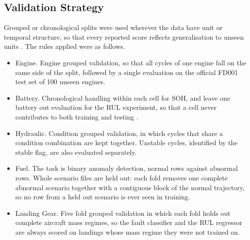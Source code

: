 \documentclass[conference]{IEEEtran}
\begin{document}
\subsection{Validation Strategy}
Grouped or chronological splits were used wherever the data have unit or temporal structure, so that every reported score reflects generalisation to unseen units \cite{b52, b53}. The rules applied were as follows.

\begin{itemize}
\item Engine. Engine grouped validation, so that all cycles of one engine fall on the same side of the split, followed by a single evaluation on the official FD001 test set of 100 unseen engines.
\item Battery. Chronological handling within each cell for SOH, and leave one battery out evaluation for the RUL experiment, so that a cell never contributes to both training and testing \cite{b24}.
\item Hydraulic. Condition grouped validation, in which cycles that share a condition combination are kept together. Unstable cycles, identified by the stable flag, are also evaluated separately.
\item Fuel. The task is binary anomaly detection, normal rows against abnormal rows. Whole scenario files are held out: each fold removes one complete abnormal scenario together with a contiguous block of the normal trajectory, so no row from a held out scenario is ever seen in training.
\item Landing Gear. Five fold grouped validation in which each fold holds out complete aircraft mass regimes, so the fault classifier and the RUL regressor are always scored on landings whose mass regime they were not trained on.
\end{itemize}
\end{document}
